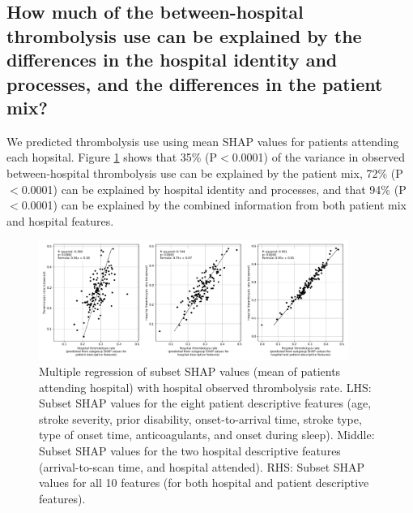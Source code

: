 \subsection{How much of the between-hospital thrombolysis use can be explained by the differences in the hospital identity and processes, and the differences in the patient mix?}%

We predicted thrombolysis use using mean SHAP values for patients attending each hopsital. Figure \ref{fig:shap_multiple_regression} shows that 35\% (P$<$0.0001) of the variance in observed between-hospital thrombolysis use can be explained by the patient mix, 72\% (P$<$0.0001) can be explained by hospital identity and processes, and that 94\% (P$<$0.0001) can be explained by the combined information from both patient mix and hospital features. 


\begin{figure}[!h]
    \centering
    \includegraphics[width=0.9\textwidth]{./images/03e_xgb_10_features_multiple_regression_patient_hosptial}
    \caption{Multiple regression of subset SHAP values (mean of patients attending hospital) with hospital observed thrombolysis rate. LHS: Subset SHAP values for the eight patient descriptive features (age, stroke severity, prior disability, onset-to-arrival time, stroke type, type of onset time, anticoagulants, and onset during sleep). Middle: Subset SHAP values for the two hospital descriptive features (arrival-to-scan time, and hospital attended). RHS: Subset SHAP values for all 10 features (for both hospital and patient descriptive features).}
  \label{fig:shap_multiple_regression}
\end{figure}


